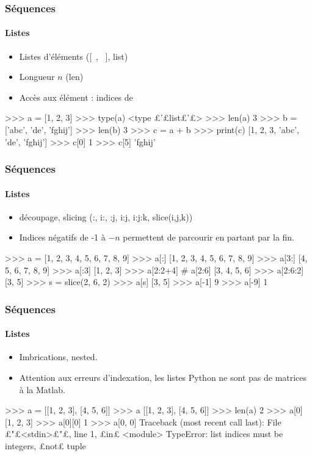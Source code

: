 \begin{frame}[fragile]
\frametitle{Séquences}
\framesubtitle{Listes}
\begin{itemize}
 \item Listes d'éléments ([\ , \ ], list)
 \item Longueur $n$ (len)
 \item Accès aux élément : indices de \color{red}{0 à $n-1$}
\end{itemize}
\begin{pythonConsole}
>>> a = [1, 2, 3]
>>> type(a)
<type £'£list£'£>
>>> len(a)
3
>>> b = ['abc', 'de', 'fghij']
>>> len(b)
3
>>> c = a + b
>>> print(c)
[1, 2, 3, 'abc', 'de', 'fghij']
>>> c[0]
1
>>> c[5]
'fghij'
\end{pythonConsole}
\end{frame}
\begin{frame}[fragile]
\frametitle{Séquences}
\framesubtitle{Listes}
\begin{itemize}
 \item découpage, slicing (:, i:, :j, i:j, i:j:k, slice(i,j,k))
 \item Indices négatifs de -1 à $-n$ permettent de parcourir en partant par la fin. 
\end{itemize}
\begin{pythonConsole}
>>> a = [1, 2, 3, 4, 5, 6, 7, 8, 9]
>>> a[:]
[1, 2, 3, 4, 5, 6, 7, 8, 9]
>>> a[3:]
[4, 5, 6, 7, 8, 9]
>>> a[:3]
[1, 2, 3]
>>> a[2:2+4] # a[2:6]
[3, 4, 5, 6]
>>> a[2:6:2]
[3, 5]
>>> s = slice(2, 6, 2)
>>> a[s]
[3, 5]
>>> a[-1]
9 
>>> a[-9]
1 
\end{pythonConsole}
\end{frame}
\begin{frame}[fragile]
\frametitle{Séquences}
\framesubtitle{Listes}
\begin{itemize}
 \item Imbrications, nested.
 \item Attention aux erreurs d'indexation, les listes Python ne sont pas de matrices à la Matlab. 
\end{itemize}
\begin{pythonConsole}
>>> a = [[1, 2, 3], [4, 5, 6]]
>>> a
[[1, 2, 3], [4, 5, 6]]
>>> len(a)
2
>>> a[0]
[1, 2, 3]
>>> a[0][0]
1
>>> a[0, 0]
Traceback (most recent call last):
  File £"£<stdin>£"£, line 1, £in£ <module>
TypeError: list indices must be integers, £not£ tuple
\end{pythonConsole}
\end{frame}
